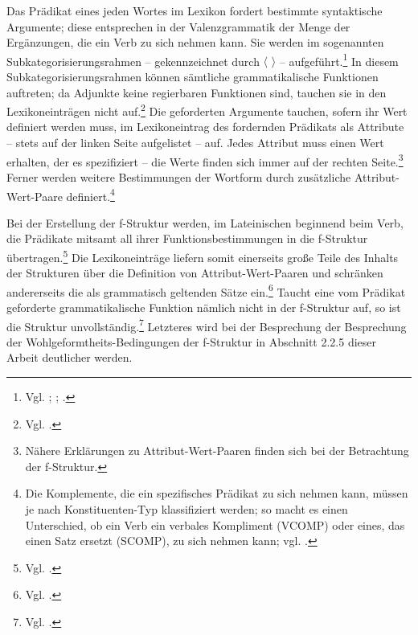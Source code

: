 \documentclass[12pt,a4paper]{article}
\begin{document}
Das Prädikat eines jeden Wortes im Lexikon fordert bestimmte syntaktische Argumente; diese entsprechen in der Valenzgrammatik der Menge der Ergänzungen, die ein Verb zu sich nehmen kann. Sie werden im sogenannten Subkategorisierungsrahmen -- gekennzeichnet durch $\langle$ $\rangle$ -- aufgeführt.\footnote{Vgl. \cite[7]{Dal}; \cite[70]{Skript}; \cite[27]{Rohrer}.} In diesem Subkategorisierungsrahmen können sämtliche grammatikalische Funktionen auftreten; da Adjunkte keine regierbaren Funktionen sind, tauchen sie in den Lexikoneinträgen nicht auf.\footnote{Vgl. \cite[27]{Rohrer}.} Die geforderten Argumente tauchen, sofern ihr Wert definiert werden muss, im Lexikoneintrag des fordernden Prädikats als Attribute -- stets auf der linken Seite aufgelistet -- auf. Jedes Attribut muss einen Wert erhalten, der es spezifiziert -- die Werte finden sich immer auf der rechten Seite.\footnote{Nähere Erklärungen zu Attribut-Wert-Paaren finden sich bei der Betrachtung der f-Struktur.} Ferner werden weitere Bestimmungen der Wortform durch zusätzliche Attribut-Wert-Paare definiert.\footnote{Die Komplemente, die ein spezifisches Prädikat zu sich nehmen kann, müssen je nach Konstituenten-Typ klassifiziert werden; so macht es einen Unterschied, ob ein Verb ein verbales Kompliment (VCOMP) oder eines, das einen Satz ersetzt (SCOMP), zu sich nehmen kann; vgl. \cite[22]{Rohrer}.}

Bei der Erstellung der f-Struktur werden, im Lateinischen beginnend beim Verb, die Prädikate mitsamt all ihrer Funktionsbestimmungen in die f-Struktur übertragen.\footnote{Vgl. \cite[28]{Rohrer}.} Die Lexikoneinträge liefern somit einerseits große Teile des Inhalts der Strukturen über die Definition von Attribut-Wert-Paaren und schränken andererseits die als grammatisch geltenden Sätze ein.\footnote{Vgl. \cite[63]{Skript}.}  Taucht eine vom Prädikat geforderte grammatikalische Funktion nämlich nicht in der f-Struktur auf, so ist die Struktur unvollständig.\footnote{Vgl. \cite[28]{Rohrer}.} Letzteres wird bei der Besprechung der Besprechung der Wohlgeformtheits-Bedingungen der f-Struktur in Abschnitt 2.2.5 dieser Arbeit deutlicher werden.
\end{document}
